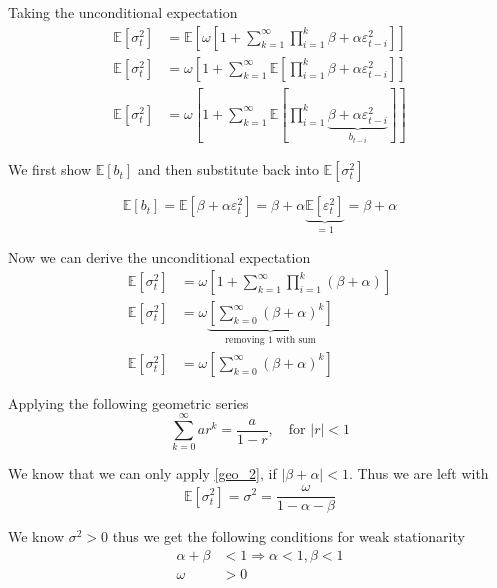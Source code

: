 \documentclass{EconHomework}
\begin{document}
Taking the unconditional expectation
\begin{align*}
\mathbb{E}\left[\sigma_{t}^{2}\right] & =\mathbb{E}\left[\omega\left[1+\sum_{k=1}^{\infty}\prod_{i=1}^{k}\beta+\alpha\varepsilon_{t-i}^{2}\right]\right]\\
\mathbb{E}\left[\sigma_{t}^{2}\right] & =\omega\left[1+\sum_{k=1}^{\infty}\mathbb{E}\left[\prod_{i=1}^{k}\beta+\alpha\varepsilon_{t-i}^{2}\right]\right]\\
\mathbb{E}\left[\sigma_{t}^{2}\right] & =\omega\left[1+\sum_{k=1}^{\infty}\mathbb{E}\left[\prod_{i=1}^{k}\underbrace{\beta+\alpha\varepsilon_{t-i}^{2}}_{b_{t-i}}\right]\right]
\end{align*}

We first show $\mathbb{E}\left[b_{t}\right]$ and then substitute
back into $\mathbb{E}\left[\sigma_{t}^{2}\right]$

\[
\mathbb{E}\left[b_{t}\right]=\mathbb{E}\left[\beta+\alpha\varepsilon_{t}^{2}\right]=\beta+\alpha\underbrace{\mathbb{E}\left[\varepsilon_{t}^{2}\right]}_{=1}=\beta+\alpha
\]

Now we can derive the unconditional expectation
\begin{align*}
\mathbb{E}\left[\sigma_{t}^{2}\right] & =\omega\left[1+\sum_{k=1}^{\infty}\prod_{i=1}^{k}\left(\beta+\alpha\right)\right]\\
\mathbb{E}\left[\sigma_{t}^{2}\right] & =\omega\underbrace{\left[\sum_{k=0}^{\infty}\left(\beta+\alpha\right)^{k}\right]}_{\text{removing 1 with sum}}\\
\mathbb{E}\left[\sigma_{t}^{2}\right] & =\omega\left[\sum_{k=0}^{\infty}\left(\beta+\alpha\right)^{k}\right]
\end{align*}

Applying the following geometric series
\begin{equation*}
    \sum_{k=0}^{\infty}ar^{k}=\frac{a}{1-r},\quad\text{for }\rvert r\rvert<1\tag{Geo 2}
    \label{geo_2}
\end{equation*}

We know that we can only apply \ref{geo_2}, if $\rvert\beta+\alpha\rvert<1$.
Thus we are left with
\[
\mathbb{E}\left[\sigma_{t}^{2}\right]=\sigma^{2}=\frac{\omega}{1-\alpha-\beta}
\]

We know $\sigma^{2}>0$ thus we get the following conditions
for weak stationarity
\begin{align*}
    \alpha+\beta & <1\Rightarrow\alpha<1,\beta<1\\
    \omega & >0
\end{align*}
\end{document}
